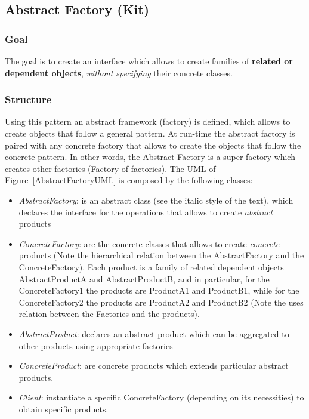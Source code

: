 \documentclass{article}
\begin{document}
\subsection{Abstract Factory (Kit)}
\subsubsection{Goal}
The goal is to create an interface which allows to create families of \textbf{related or dependent objects}, \textit{without specifying} their concrete classes. 

\subsubsection{Structure}


Using this pattern an abstract framework (factory) is defined, which allows to create objects that follow a general pattern. At run-time the abstract factory is paired with any concrete factory that allows to create the objects that follow the concrete pattern. In other words, the Abstract Factory is a super-factory which creates other factories (Factory of factories). The UML of Figure~\ref{AbstractFactoryUML} is composed by the following classes:
\begin{itemize}
\item \emph{AbstractFactory}: is an abstract class (see the italic style of the text), which declares the interface for the operations that allows to create \emph{abstract} products
\item \emph{ConcreteFactory}: are the concrete classes that allows to create \emph{concrete} products (Note the hierarchical relation between the AbstractFactory and the ConcreteFactory). Each product is a family of related dependent objects AbstractProductA and AbstractProductB, and in particular, for the ConcreteFactory1 the products are ProductA1 and ProductB1, while for the ConcreteFactory2 the products are ProductA2 and ProductB2 (Note the uses relation between the Factories and the products).
\item \emph{AbstractProduct}:  declares an abstract product which can be aggregated to other products using appropriate factories
\item \emph{ConcreteProduct}: are  concrete products which extends  particular abstract products.
\item \emph{Client}: instantiate a specific ConcreteFactory (depending on its necessities) to obtain specific products.
\end{itemize}
\end{document}
